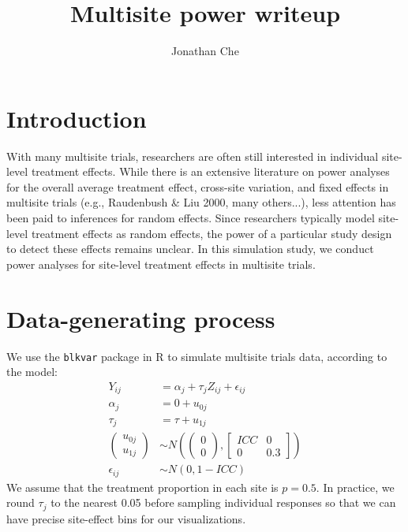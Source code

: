 \documentclass[]{article}
\title{Multisite power writeup}
\author{Jonathan Che}
\begin{document}
	
\maketitle



\section{Introduction}

With many multisite trials, researchers are often still interested in individual site-level treatment effects.
While there is an extensive literature on power analyses for the overall average treatment effect, cross-site variation, and fixed effects in multisite trials (e.g., Raudenbush \& Liu 2000, many others...), less attention has been paid to inferences for random effects.
Since researchers typically model site-level treatment effects as random effects, the power of a particular study design to detect these effects remains unclear.
In this simulation study, we conduct power analyses for site-level treatment effects in multisite trials.


\section{Data-generating process}

We use the \texttt{blkvar} package in R to simulate multisite trials data, according to the model:
\begin{align*}
	Y_{ij} &= \alpha_j + \tau_j Z_{ij} + \epsilon_{ij} \\
	\alpha_j &= 0 + u_{0j} \\
	\tau_j &= \tau + u_{1j} \\
	\begin{pmatrix}
		u_{0j} \\ u_{1j}
	\end{pmatrix} &\sim N(
	\begin{pmatrix}
		0 \\ 0
	\end{pmatrix}, 
	\begin{bmatrix}
		ICC & 0 \\ 0 & 0.3
	\end{bmatrix}) \\
	\epsilon_{ij} &\sim N(0, 1-ICC)
\end{align*}
We assume that the treatment proportion in each site is $p=0.5$.
In practice, we round $\tau_j$ to the nearest 0.05 before sampling individual responses so that we can have precise site-effect bins for our visualizations.
\end{document}

